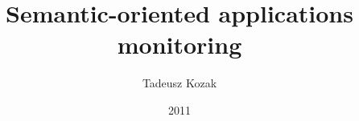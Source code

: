 \documentclass[en]{aghMasters}
\author{Tadeusz Kozak}
\title{Semantic-oriented applications monitoring}
\date{2011}
\begin{document}
\titlepages



\tableofcontents
\clearpage
\listoffigures
\clearpage
\listoftables











\end{document}
